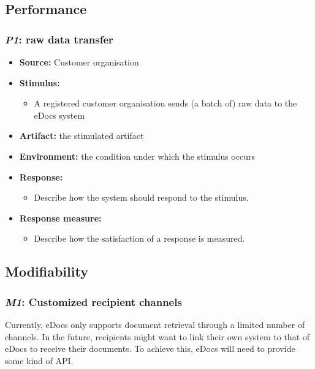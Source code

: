 \documentclass[a4paper,10pt]{article}
\begin{document}
\subsection{Performance}
\subsubsection{\emph{P1}: raw data transfer }


\begin{itemize}
    \item \textbf{Source:} Customer organisation
    \item \textbf{Stimulus:}
        \begin{itemize}
            \item A registered customer organisation sends (a batch of) raw data to the eDocs system
        \end{itemize}

    \item \textbf{Artifact:} the stimulated artifact
    \item \textbf{Environment:} the condition under which the stimulus occurs
    \item \textbf{Response:}
        \begin{itemize}
            \item Describe how the system should respond to the stimulus.
        \end{itemize}

    \item \textbf{Response measure:}
        \begin{itemize}
            \item Describe how the satisfaction of a response is measured.
        \end{itemize}
\end{itemize}

\subsection{Modifiability}
\subsubsection{\emph{M1}: Customized recipient channels}
Currently, eDocs only supports document retrieval through a limited number of channels. In the future, recipients might want to link their own system to that of eDocs to receive their documents. To achieve this, eDocs will need to provide some kind of API.
\end{document}
